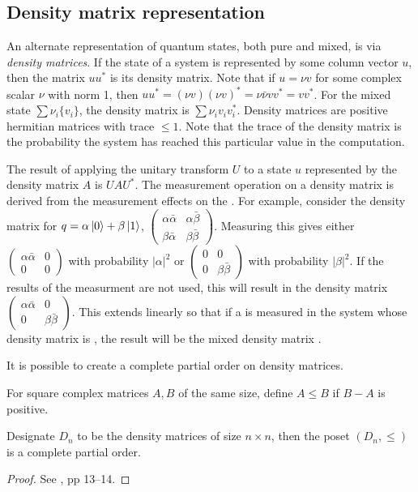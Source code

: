\subsection{Density matrix representation}\label{sec:density}
An alternate representation of quantum states, both pure and mixed, is via \emph{density matrices}.
If the state of a system is represented by some column vector $u$, then the matrix $u u^{*}$ is its
density matrix. Note that if $u = \nu v$ for some complex scalar $\nu$ with norm 1, then $u u^{*} =
(\nu v) (\nu v)^{*} = \nu \bar{\nu} v v^{*} = v v^{*} $. For the mixed state $\sum
\nu_{i}\{v_{i}\}$, the density matrix is $\sum \nu_{i}v_{i}v_{i}^{*}$. Density matrices are
positive hermitian matrices with trace $\le 1$. Note that the trace of the density matrix is the
probability the system has reached this particular value in the computation.

The result of applying the unitary transform $U$ to a state $u$ represented by the density matrix
$A$ is $UAU^{*}$. The measurement operation on a density matrix is derived from the measurement
effects on the \qubit. For example, consider the density matrix for $q=\alpha\left\vert{0}\right\rangle+\beta\left\vert{1}\right\rangle$,
$\begin{pmatrix}\alpha\bar{\alpha}&\alpha\bar{\beta}\\ \beta\bar{\alpha} &
\beta\bar{\beta}\end{pmatrix}$. Measuring this \qubit gives either
$\begin{pmatrix}\alpha\bar{\alpha}&0\\ 0& 0\end{pmatrix}$ with probability $|\alpha|^{2}$ or
$\begin{pmatrix}0&0\\ 0 & \beta\bar{\beta}\end{pmatrix}$ with probability $|\beta|^{2}$. If the
results of the measurment are not used, this will result in the density matrix
$\begin{pmatrix}\alpha\bar{\alpha}&0\\ 0 & \beta\bar{\beta}\end{pmatrix}$. This extends linearly so
that if a \qubit is measured in the system whose density matrix is , the result
will be the mixed density matrix .

It is possible to create a complete partial order on density matrices.

\begin{definition}\label{def:lownerorder}
  For square complex matrices $A,B$ of the same size, define $A \le B$ if $B-A$ is positive.
\end{definition}

\begin{lemma} \label{lemma:cpodensity}
  Designate $D_{n}$ to be the density matrices of size $n\times n$, then the poset $(D_{n}, \le)$
  is a complete partial order.
\end{lemma}
\begin{proof}
  See \cite{selinger04:qpl}, pp 13--14.
\end{proof}


